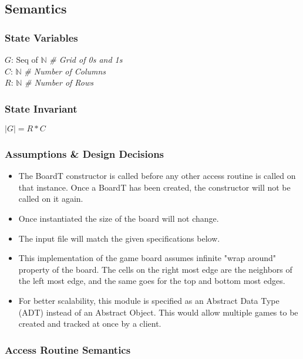\documentclass[12pt]{article}
\begin{document}
\subsection* {Semantics}

\subsubsection* {State Variables}
$G$: Seq of $\mathbb{N}$ \textit{\# Grid of 0s and 1s}\\
$C$: $\mathbb{N}$ \textit{\# Number of Columns}\\
$R$: $\mathbb{N}$ \textit{\# Number of Rows}\\

\subsubsection* {State Invariant}
$|G| = R * C$

\subsubsection* {Assumptions \& Design Decisions}

\begin{itemize}
\item The BoardT constructor is called before any other access
  routine is called on that instance. Once a BoardT has been created, the
  constructor will not be called on it again.
\item Once instantiated the size of the board will not change.
\item The input file will match the given specifications below.
\item This implementation of the game board assumes infinite "wrap around" property of the board. The cells on the right most edge are the neighbors of the left most edge, and the same goes for the top and bottom most edges.
\item For better scalability, this module is specified as an Abstract Data Type
  (ADT) instead of an Abstract Object. This would allow multiple games to be
  created and tracked at once by a client.
\end{itemize}



\subsubsection* {Access Routine Semantics}
\end{document}
